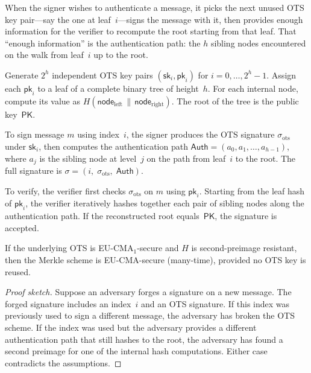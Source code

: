 When the signer wishes to authenticate a message, it picks the next unused OTS key pair---say the one at leaf~$i$---signs the message with it, then provides enough information for the verifier to recompute the root starting from that leaf.  That ``enough information'' is the authentication path: the $h$ sibling nodes encountered on the walk from leaf~$i$ up to the root.

\begin{definition}
\label{def:merkle-scheme}
Generate $2^h$ independent OTS key pairs $(\mathsf{sk}_i, \mathsf{pk}_i)$ for $i = 0,\ldots,2^h - 1$.  Assign each $\mathsf{pk}_i$ to a leaf of a complete binary tree of height~$h$.  For each internal node, compute its value as $H(\mathsf{node}_{\mathrm{left}} \,\|\, \mathsf{node}_{\mathrm{right}})$.  The root of the tree is the public key~$\mathsf{PK}$.

To sign message $m$ using index~$i$, the signer produces the OTS signature $\sigma_{\mathrm{ots}}$ under $\mathsf{sk}_i$, then computes the authentication path $\mathsf{Auth} = (a_0, a_1, \ldots, a_{h-1})$, where $a_j$ is the sibling node at level~$j$ on the path from leaf~$i$ to the root.  The full signature is $\sigma = (i,\; \sigma_{\mathrm{ots}},\; \mathsf{Auth})$.

To verify, the verifier first checks $\sigma_{\mathrm{ots}}$ on $m$ using $\mathsf{pk}_i$.  Starting from the leaf hash of $\mathsf{pk}_i$, the verifier iteratively hashes together each pair of sibling nodes along the authentication path.  If the reconstructed root equals~$\mathsf{PK}$, the signature is accepted.
\end{definition}

\begin{theorem}
\label{thm:merkle-security}
If the underlying OTS is EU-CMA$_1$-secure and $H$ is second-preimage resistant, then the Merkle scheme is EU-CMA-secure (many-time), provided no OTS key is reused.
\end{theorem}

\begin{proof}[Proof sketch]
Suppose an adversary forges a signature on a new message.  The forged signature includes an index~$i$ and an OTS signature.  If this index was previously used to sign a different message, the adversary has broken the OTS scheme.  If the index was used but the adversary provides a different authentication path that still hashes to the root, the adversary has found a second preimage for one of the internal hash computations.  Either case contradicts the assumptions.
\end{proof}

